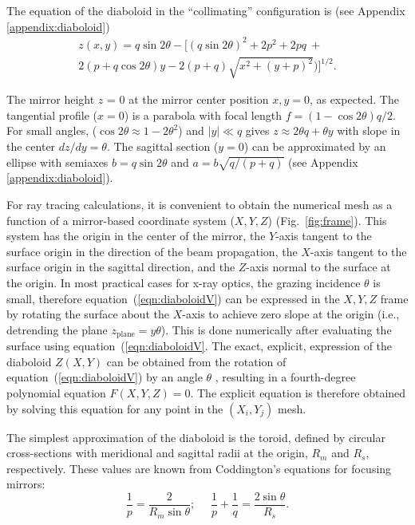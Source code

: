 \documentclass{iucr}       %
\begin{document}
The equation of the diaboloid in the ``collimating'' configuration is (see Appendix \ref{appendix:diaboloid})
\begin{multline}
\label{eqn:diaboloidV}
z(x,y) = q \sin2\theta - 
[ (q \sin{2\theta})^2 + 2p^2 + 2 p q~+\\
2 (p + q \cos{2\theta}) y - 2 (p+q) \sqrt{x^2 + (y + p)^2}) ]^{1/2}.
\end{multline}

The mirror height $z$ = 0 at the mirror center position $x, y = 0$, as expected. The tangential profile ($x=0$) is a parabola with focal length $ f = (1-\cos2\theta) q/2$. For small angles, ($\cos2\theta\approx 1 - 2\theta^2$) and $|y|\ll q$ gives $z\approx 2 \theta q + \theta y$ with slope in the center $dz/dy=\theta$. The sagittal section ($y=0$) can be approximated by an ellipse with semiaxes $b=q \sin2\theta$ and $a=b \sqrt{q /(p+q)}$ (see Appendix \ref{appendix:diaboloid}). 

For ray tracing calculations, it is convenient to obtain the numerical mesh as a function of a mirror-based coordinate system ($X,Y,Z$) (Fig.~\ref{fig:frame}). This system has the origin in the center of the mirror, the $Y$-axis tangent to the surface origin in the direction of the beam propagation, the $X$-axis tangent to the surface origin in the sagittal direction, and the $Z$-axis normal to the surface at the origin. In most practical cases for x-ray optics, the grazing incidence $\theta$ is small, therefore equation~(\ref{eqn:diaboloidV}) can be expressed in the $X,Y,Z$ frame by rotating the surface about the $X$-axis to achieve zero slope at the origin (i.e., detrending the plane $z_{\mathrm{plane}}=y \theta$). This is done numerically after evaluating the surface using equation~(\ref{eqn:diaboloidV}. The exact, explicit, expression of the diaboloid $Z(X,Y)$ can be obtained from the rotation of equation~(\ref{eqn:diaboloidV}) by an angle $\theta$ \cite{val2021}, resulting in a fourth-degree polynomial equation $F(X,Y,Z)=0$. The explicit equation is therefore obtained by solving this equation for any point in the $(X_i,Y_j)$ mesh.


The simplest approximation of the diaboloid is the toroid, defined by circular cross-sections with meridional and sagittal radii at the origin, $R_m$ and $R_s$, respectively. These values are known from Coddington's equations for focusing mirrors:
\begin{equation}
\label{eqn:radii}
\frac{1}{p} = \frac{2 }{R_m \sin\theta };~~~~~~
\frac{1}{p} + \frac{1}{q} = \frac{2\sin\theta}{ R_s}.
\end{equation}
\end{document}
